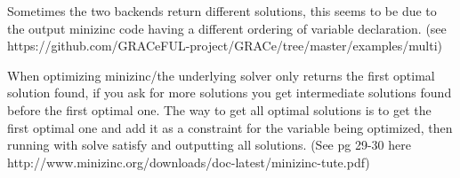 Sometimes the two backends return different solutions, this seems to be due to
the output minizinc code having a different ordering of variable declaration.
(see https://github.com/GRACeFUL-project/GRACe/tree/master/examples/multi)

When optimizing minizinc/the underlying solver only returns the first optimal solution found, if you ask for more solutions you get intermediate solutions found before the first optimal one.
The way to get all optimal solutions is to get the first optimal one and add it as a constraint for the variable being optimized, then running with solve satisfy and outputting all solutions.
(See pg 29-30 here http://www.minizinc.org/downloads/doc-latest/minizinc-tute.pdf)

